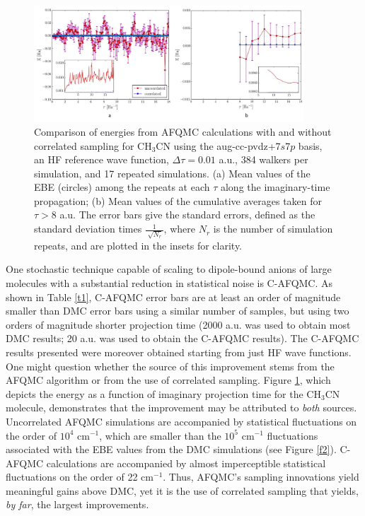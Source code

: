 \begin{center}
\begin{figure}[htbp]
\includegraphics[width=0.9\textwidth]{Images/chapter2/correlated_sampling.pdf}
\caption{Comparison of energies from AFQMC calculations with and without correlated sampling for CH$_{3}$CN using the aug-cc-pvdz+7$s$7$p$ basis, an HF reference wave function, $\Delta \tau=0.01$ a.u., 384 walkers per simulation, and 17 repeated simulations. (a) Mean values of the EBE (circles) among the repeats at each $\tau$ along the imaginary-time propagation; (b) Mean values of the cumulative averages taken for $\tau > 8$ a.u. The error bars give the standard errors, defined as the standard deviation times $\frac{1}{\sqrt[]{N_r}}$, where $N_r$ is the number of simulation repeats, and are plotted in the insets for clarity.}
\label{f3}
\end{figure}
\end{center}
One stochastic technique capable of scaling to dipole-bound anions of large molecules with a substantial reduction in statistical noise is C-AFQMC. As shown in Table \ref{t1}, C-AFQMC error bars are at least an order of magnitude smaller than DMC error bars using
a similar number of samples, but using two orders of magnitude shorter projection time (2000 a.u. was used to obtain most DMC results; 20 a.u. was used to obtain the C-AFQMC results). The C-AFQMC results presented were moreover obtained starting from just HF wave functions. One might question whether the source of this improvement stems from the AFQMC algorithm or from the use of correlated sampling. Figure \ref{f3}, which depicts the energy as a function of imaginary projection time for the CH$_{3}$CN molecule, demonstrates that the improvement may be attributed to \textit{both} sources. Uncorrelated AFQMC simulations are accompanied by statistical fluctuations on the order of $10^{4}$ cm$^{-1}$, which are smaller than the $10^{5}$ cm$^{-1}$ fluctuations associated with the EBE values from the DMC simulations (see Figure \ref{f2}). C-AFQMC calculations are accompanied by almost imperceptible statistical fluctuations on the order of 22 cm$^{-1}$. Thus, AFQMC's sampling innovations yield meaningful gains above DMC, yet it is the use of correlated sampling that yields, \textit{by far}, the largest improvements. 

